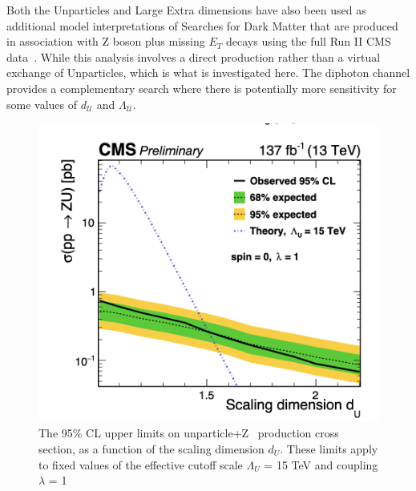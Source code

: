 Both the Unparticles and Large Extra dimensions have also been used as additional model interpretations of Searches for Dark Matter that are produced in association with Z boson plus missing $E_{T}$ decays using the full Run II CMS data~\cite{CMS:2020ulv}. While this analysis involves a direct production rather than a virtual exchange of Unparticles, which is what is investigated here. The diphoton channel provides a complementary search where there is potentially more sensitivity for some values of $d_{\mathcal{U}}$ and $\Lambda_{\mathcal{U}}$.

\begin{figure}
    \centering
    \includegraphics[scale=0.7]{fig/Unparticles.png}
    \caption{The 95\% CL upper limits on unparticle+Z~\cite{CMS:2020ulv} production cross section, as a function of the scaling dimension $d_U$. These limits apply to fixed values of the effective cutoff scale $\Lambda_U$ = 15 TeV and coupling $\lambda$ = 1 }
    \label{fig:UnparZMET}
\end{figure}

\newpage



% 
% 


